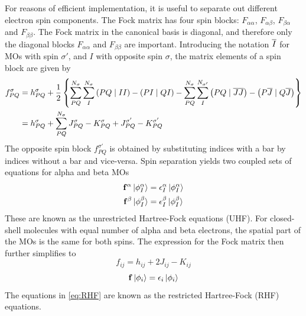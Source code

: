 For reasons of efficient implementation, it is useful to separate out different electron spin components. The Fock matrix has four spin blocks: $F_{\alpha\alpha}$, $F_{\alpha\beta}$, $F_{\beta\alpha}$ and $F_{\beta\beta}$. The Fock matrix in the canonical basis is diagonal, and therefore only the diagonal blocks  $F_{\alpha\alpha}$ and $F_{\beta\beta}$ are important. Introducing the notation $\overline{I}$ for MOs with spin $\sigma'$, and $I$ with opposite spin $\sigma$, the matrix elements of a spin block are given by
\begin{equation}
\begin{split}
f_{PQ}^{\sigma} &= h_{PQ}^{\sigma} + \frac{1}{2} \left\lbrace \sum^{N_{\sigma}}_{PQ}\sum^{N_{\sigma}}_{I} \left( PQ \mid II \right) - \left( PI \mid QI \right)  - \sum^{N_{\sigma}}_{PQ}\sum^{N_{\sigma'}}_{I} \left( PQ \mid \overline{J}\overline{J} \right) - \left( P\overline{J} \mid Q\overline{J} \right) \right\rbrace \\
&= h_{PQ}^{\sigma} + \sum^{N_{\sigma}}_{PQ} J^{\sigma}_{PQ} - K^{\sigma}_{PQ} + J^{\sigma'}_{PQ} - K^{\sigma'}_{PQ}
\end{split}
\end{equation}
\noindent The opposite spin block $f_{PQ}^{\sigma'}$ is obtained by substituting indices with a bar by indices without a bar and vice-versa. Spin separation yields two coupled sets of equations for alpha and beta MOs
\begin{equation}
\begin{split}
\mathbf{f}^{\alpha} \ket{\smash{\phi^{\alpha}_I}} &= \epsilon^{\alpha}_I \ket{\smash{\phi^{\alpha}_I}} \\
\mathbf{f}^{\beta} \ket{\smash{\phi^{\beta}_I}} &= \epsilon^{\beta}_I \ket{\smash{\phi^{\beta}_I}} 
\end{split}
\label{eq:UHF}
\end{equation} 
\noindent These are known as the unrestricted Hartree-Fock equations (UHF). For closed-shell molecules with equal number of alpha and beta electrons, the spatial part of the MOs is the same for both spins. The expression for the Fock matrix then further simplifies to 
\begin{equation}
f_{ij} = h_{ij} + 2J_{ij} - K_{ij} 
\end{equation}
\begin{equation}
\mathbf{f} \ket{\phi_i} = \epsilon_i \ket{\phi_i}
\label{eq:RHF}
\end{equation}
\noindent The equations in \ref{eq:RHF} are known as the restricted Hartree-Fock (RHF) equations. 

